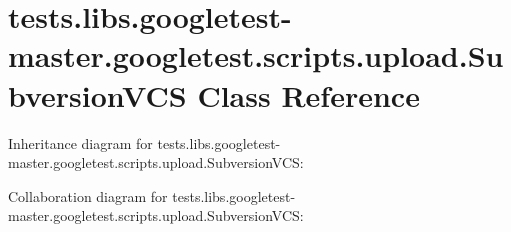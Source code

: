 \hypertarget{classtests_1_1libs_1_1googletest-master_1_1googletest_1_1scripts_1_1upload_1_1SubversionVCS}{}\section{tests.\+libs.\+googletest-\/master.googletest.\+scripts.\+upload.\+Subversion\+V\+CS Class Reference}
\label{classtests_1_1libs_1_1googletest-master_1_1googletest_1_1scripts_1_1upload_1_1SubversionVCS}


Inheritance diagram for tests.\+libs.\+googletest-\/master.googletest.\+scripts.\+upload.\+Subversion\+V\+CS\+:


Collaboration diagram for tests.\+libs.\+googletest-\/master.googletest.\+scripts.\+upload.\+Subversion\+V\+CS\+:
